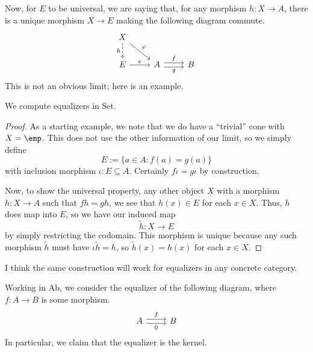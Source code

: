 \documentclass[../notes.tex]{subfiles}
\begin{document}
Now, for $E$ to be universal, we are saying that, for any morphism $h:X\to A$, there is a unique morphism $X\to E$ making the following diagram commute.
\[\begin{tikzcd}
	X \\
	E & A & B
	\arrow["g"', shift right=1, from=2-2, to=2-3]
	\arrow["f", shift left=1, from=2-2, to=2-3]
	\arrow["e", from=2-1, to=2-2]
	\arrow["h"', dashed, from=1-1, to=2-1]
	\arrow["\varphi", from=1-1, to=2-2]
\end{tikzcd}\]
This is not an obvious limit; here is an example.
\begin{exe}
	We compute equalizers in $\mathrm{Set}$.
\end{exe}
\begin{proof}
	As a starting example, we note that we do have a ``trivial'' cone with $X=\emp$. This does not use the other information of our limit, so we simply define
	\[E:=\{a\in A:f(a)=g(a)\}\]
	with inclusion morphism $\iota:E\subseteq A$. Certainly $f\iota=g\iota$ by construction.

	Now, to show the universal property, any other object $X$ with a morphism $h:X\to A$ such that $fh=gh$, we see that $h(x)\in E$ for each $x\in X$. Thus, $h$ does map into $E$, so we have our induced map
	\[\widetilde h:X\to E\]
	by simply restricting the codomain. This morphism is unique because any such morphism $\widetilde h$ must have $\iota\widetilde h=h$, so $\widetilde h(x)=h(x)$ for each $x\in X$.
\end{proof}
\begin{remark}
	I think the same construction will work for equalizers in any concrete category.
\end{remark}
\begin{exe}
	Working in $\mathrm{Ab}$, we consider the equalizer of the following diagram, where $f:A\to B$ is some morphism.
	\[\begin{tikzcd}
		A & B
		\arrow["0"', shift right=1, from=1-1, to=1-2]
		\arrow["f", shift left=1, from=1-1, to=1-2]
	\end{tikzcd}\]
	In particular, we claim that the equalizer is the kernel.
\end{exe}
\end{document}

